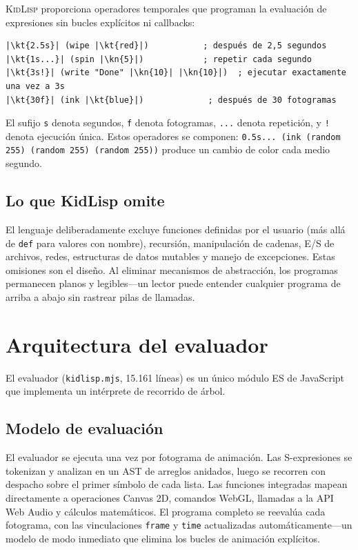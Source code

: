 \documentclass[10pt,letterpaper,twocolumn]{article}
\newcommand{\kn}[1]{\textcolor{klnum}{#1}}
\newcommand{\kt}[1]{\textcolor{klstr}{#1}}
\newcommand{\kidlisp}{\textsc{KidLisp}}
\begin{document}
\kidlisp{} proporciona operadores temporales que programan la evaluación de expresiones sin bucles explícitos ni callbacks:

\begin{lstlisting}
|\kt{2.5s}| (wipe |\kt{red}|)           ; después de 2,5 segundos
|\kt{1s...}| (spin |\kn{5}|)            ; repetir cada segundo
|\kt{3s!}| (write "Done" |\kn{10}| |\kn{10}|)  ; ejecutar exactamente una vez a 3s
|\kt{30f}| (ink |\kt{blue}|)             ; después de 30 fotogramas
\end{lstlisting}

El sufijo \texttt{s} denota segundos, \texttt{f} denota fotogramas, \texttt{...} denota repetición, y \texttt{!} denota ejecución única. Estos operadores se componen: \texttt{0.5s... (ink (random 255) (random 255) (random 255))} produce un cambio de color cada medio segundo.

\subsection{Lo que KidLisp omite}

El lenguaje deliberadamente excluye funciones definidas por el usuario (más allá de \texttt{def} para valores con nombre), recursión, manipulación de cadenas, E/S de archivos, redes, estructuras de datos mutables y manejo de excepciones. Estas omisiones son el diseño. Al eliminar mecanismos de abstracción, los programas permanecen planos y legibles---un lector puede entender cualquier programa de arriba a abajo sin rastrear pilas de llamadas.


\section{Arquitectura del evaluador}
\label{sec:architecture}

El evaluador (\texttt{kidlisp.mjs}, 15.161 líneas) es un único módulo ES de JavaScript que implementa un intérprete de recorrido de árbol.

\subsection{Modelo de evaluación}

El evaluador se ejecuta una vez por fotograma de animación. Las S-expresiones se tokenizan y analizan en un AST de arreglos anidados, luego se recorren con despacho sobre el primer símbolo de cada lista. Las funciones integradas mapean directamente a operaciones Canvas 2D, comandos WebGL, llamadas a la API Web Audio y cálculos matemáticos. El programa completo se reevalúa cada fotograma, con las vinculaciones \texttt{frame} y \texttt{time} actualizadas automáticamente---un modelo de modo inmediato que elimina los bucles de animación explícitos.
\end{document}
